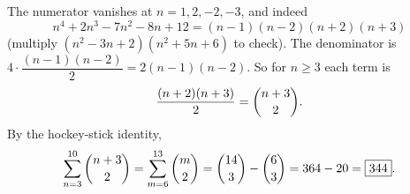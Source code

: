 The numerator vanishes at $n=1,2,-2,-3$, and indeed
\[
n^4+2n^3-7n^2-8n+12=(n-1)(n-2)(n+2)(n+3)
\]
(multiply $(n^2-3n+2)(n^2+5n+6)$ to check). The denominator is $4\cdot\dfrac{(n-1)(n-2)}{2}=2(n-1)(n-2)$. So for $n\ge3$ each term is
\[
\dfrac{(n+2)(n+3)}{2}=\dbinom{n+3}{2}.
\]
By the hockey-stick identity,
\[
\sum_{n=3}^{10}\dbinom{n+3}{2}=\sum_{m=6}^{13}\dbinom m2=\dbinom{14}{3}-\dbinom{6}{3}=364-20=\boxed{344}.
\]
